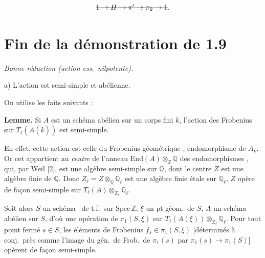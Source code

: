 \documentclass[11pt,a4paper]{article}
\begin{document}
 
\[
  \text{\struck{$1 \to H \to \pi' \to \pi_0 \to 1$}} .
\]

\section*{Fin de la démonstration de 1.9}

\emph{Bonne réduction  (action ess.\ nilpotente).}

a) L'action est semi-simple et abélienne.

On utilise les faits suivants :

\textbf{Lemme.} Si $A$ est un schéma abélien sur un corps fini $k$, l'action des  Frobenius sur $T_\ell(A(\overline{k}))$ est semi-simple.

En effet, \struck{\ill{}} cette action est \struck{\ill{}}  celle du Frobenius géométrique \struck{\ill{}}, endomorphisme de $A_{\overline{k}}$.  Or cet  appartient au \emph{centre} de l'anneau $\mathrm{End}(A) \otimes_{\mathbb{Z}} \mathbb{Q}$ des endomorphismes , qui, par Weil [2], est une algèbre  semi-simple sur $\mathbb{Q}$, dont le centre $Z$ \struck{\ill{}} est une algèbre finie \struck{\ill{}}  de $\mathbb{Q}$. Donc $Z_\ell = Z \otimes_{\mathbb{Q}} \mathbb{Q}_\ell$ \struck{\ill{}} est une algèbre finie étale sur $\mathbb{Q}_\ell$,  \ill{} $Z$ opère de façon semi-simple sur $T_\ell(A) \otimes_{\mathbb{Z}_\ell} \mathbb{Q}_\ell$.

\textbf{ } Soit alors $S$ un schéma \ de t.f.\ sur $\mathrm{Spec}\,\mathbb{Z}$, $\xi$ un pt géom.\ de $S$, $A$ un schéma abélien sur $S$,  d'où une opération de $\pi_1(S,\xi)$ sur  $T_\ell(A(\xi)) \otimes_{\mathbb{Z}_\ell} \mathbb{Q}_\ell$. Pour tout point fermé $s \in S$, les éléments de Frobenius $f_s \in \pi_1(S,\xi)$ [déterminés à \struck{\ill{}} conj.\ près comme l'image du gén.\ de Frob.\ de $\pi_1(s)$ par $\pi_1(s) \to \pi_1(S)$] opèrent \struck{\ill{}} de façon semi-simple.
\end{document}
